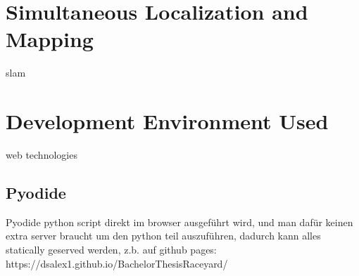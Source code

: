 \section{Simultaneous Localization and Mapping}
\ac{slam}

\section{Development Environment Used}
web technologies

\subsection{Pyodide}
Pyodide \cite{pyodide}
python script direkt im browser ausgeführt wird, und man dafür keinen extra server braucht um den python teil auszuführen,
dadurch kann alles statically geserved werden, z.b. auf github pages: https://dsalex1.github.io/BachelorThesisRaceyard/
